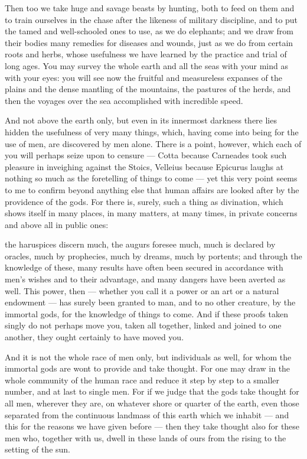  Then too we take huge and savage beasts by hunting, both to feed on them and to train ourselves in the chase after the likeness of military discipline, and to put the tamed and well-schooled ones to use, as we do elephants; and we draw from their bodies many remedies for diseases and wounds, just as we do from certain roots and herbs, whose usefulness we have learned by the practice and trial of long ages. You may survey the whole earth and all the seas with your mind as with your eyes: you will see now the fruitful and measureless expanses of the plains and the dense mantling of the mountains, the pastures of the herds, and then the voyages over the sea accomplished with incredible speed.

 And not above the earth only, but even in its innermost darkness there lies hidden the usefulness of very many things, which, having come into being for the use of men, are discovered by men alone. There is a point, however, which each of you will perhaps seize upon to censure — Cotta because Carneades took such pleasure in inveighing against the Stoics, Velleius because Epicurus laughs at nothing so much as the foretelling of things to come — yet this very point seems to me to confirm beyond anything else that human affairs are looked after by the providence of the gods. For there is, surely, such a thing as divination, which shows itself in many places, in many matters, at many times, in private concerns and above all in public ones:

 the haruspices discern much, the augurs foresee much, much is declared by oracles, much by prophecies, much by dreams, much by portents; and through the knowledge of these, many results have often been secured in accordance with men's wishes and to their advantage, and many dangers have been averted as well. This power, then — whether you call it a power or an art or a natural endowment — has surely been granted to man, and to no other creature, by the immortal gods, for the knowledge of things to come. And if these proofs taken singly do not perhaps move you, taken all together, linked and joined to one another, they ought certainly to have moved you.

 And it is not the whole race of men only, but individuals as well, for whom the immortal gods are wont to provide and take thought. For one may draw in the whole community of the human race and reduce it step by step to a smaller number, and at last to single men. For if we judge that the gods take thought for all men, wherever they are, on whatever shore or quarter of the earth, even those separated from the continuous landmass of this earth which we inhabit — and this for the reasons we have given before — then they take thought also for these men who, together with us, dwell in these lands of ours from the rising to the setting of the sun.

